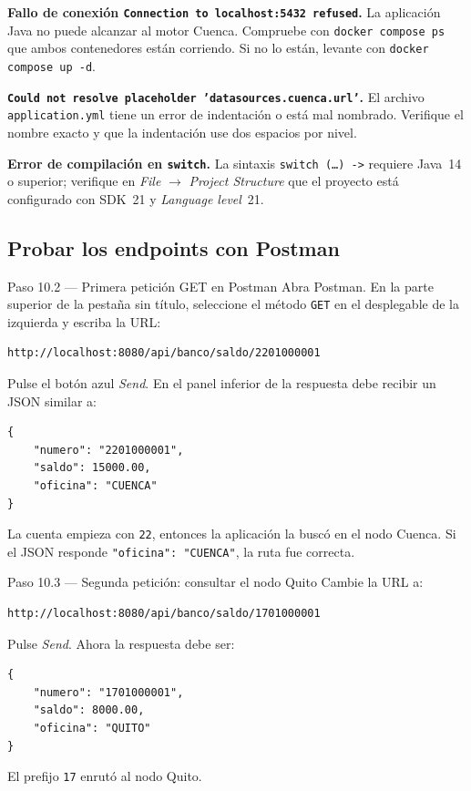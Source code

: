 \documentclass[11pt,a4paper]{article}
\begin{document}
\begin{errorbox}
\textbf{Fallo de conexi\'on \texttt{Connection to localhost:5432 refused}.} La aplicaci\'on Java no puede alcanzar al motor Cuenca. Compruebe con \texttt{docker compose ps} que ambos contenedores est\'an corriendo. Si no lo est\'an, levante con \texttt{docker compose up -d}.

\textbf{\texttt{Could not resolve placeholder 'datasources.cuenca.url'}.} El archivo \texttt{application.yml} tiene un error de indentaci\'on o est\'a mal nombrado. Verifique el nombre exacto y que la indentaci\'on use dos espacios por nivel.

\textbf{Error de compilaci\'on en \texttt{switch}.} La sintaxis \texttt{switch (\ldots) -\textgreater{}} requiere Java~14 o superior; verifique en \emph{File} $\rightarrow$ \emph{Project Structure} que el proyecto est\'a configurado con SDK~21 y \emph{Language level}~21.
\end{errorbox}

\subsection{Probar los endpoints con Postman}

\begin{pasobox}{Paso 10.2 --- Primera petici\'on GET en Postman}
Abra Postman. En la parte superior de la pesta\~na sin t\'itulo, seleccione el m\'etodo \texttt{GET} en el desplegable de la izquierda y escriba la URL:

\begin{lstlisting}[style=plainstyle]
http://localhost:8080/api/banco/saldo/2201000001
\end{lstlisting}

Pulse el bot\'on azul \emph{Send}. En el panel inferior de la respuesta debe recibir un JSON similar a:

\begin{lstlisting}[style=plainstyle]
{
    "numero": "2201000001",
    "saldo": 15000.00,
    "oficina": "CUENCA"
}
\end{lstlisting}

La cuenta empieza con \texttt{22}, entonces la aplicaci\'on la busc\'o en el nodo Cuenca. Si el JSON responde \texttt{"oficina": "CUENCA"}, la ruta fue correcta.
\end{pasobox}

\begin{pasobox}{Paso 10.3 --- Segunda petici\'on: consultar el nodo Quito}
Cambie la URL a:

\begin{lstlisting}[style=plainstyle]
http://localhost:8080/api/banco/saldo/1701000001
\end{lstlisting}

Pulse \emph{Send}. Ahora la respuesta debe ser:

\begin{lstlisting}[style=plainstyle]
{
    "numero": "1701000001",
    "saldo": 8000.00,
    "oficina": "QUITO"
}
\end{lstlisting}

El prefijo \texttt{17} enrut\'o al nodo Quito.
\end{pasobox}
\end{document}
